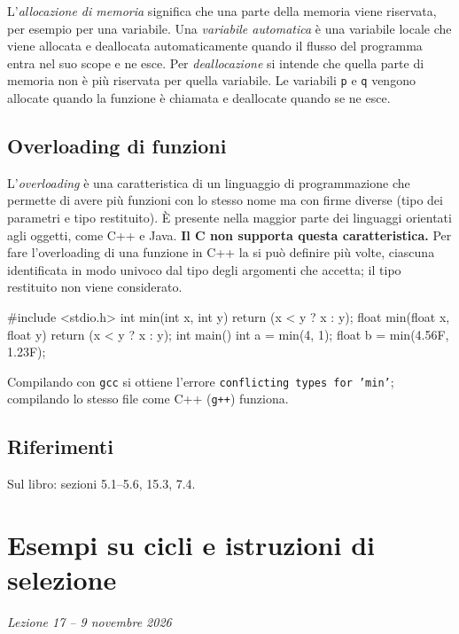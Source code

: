 \documentclass[11pt,a4paper]{article}
\begin{document}
L'\emph{allocazione di memoria} significa che una parte della memoria viene riservata, per esempio per una variabile. Una \emph{variabile automatica} è una variabile locale che viene allocata e deallocata automaticamente quando il flusso del programma entra nel suo scope e ne esce. Per \emph{deallocazione} si intende che quella parte di memoria non è più riservata per quella variabile. Le variabili \lstinline|p| e \lstinline|q| vengono allocate quando la funzione è chiamata e deallocate quando se ne esce.

\subsection{Overloading di funzioni}

L'\emph{overloading} è una caratteristica di un linguaggio di programmazione che permette di avere più funzioni con lo stesso nome ma con firme diverse (tipo dei parametri e tipo restituito). È presente nella maggior parte dei linguaggi orientati agli oggetti, come C++ e Java. \textbf{Il C non supporta questa caratteristica.} Per fare l'overloading di una funzione in C++ la si può definire più volte, ciascuna identificata in modo univoco dal tipo degli argomenti che accetta; il tipo restituito non viene considerato.

\begin{esempio}
\begin{codice}
#include <stdio.h>
int min(int x, int y) {
    return (x < y ? x : y);
}
float min(float x, float y) {
    return (x < y ? x : y);
}
int main() {
    int a = min(4, 1);
    float b = min(4.56F, 1.23F);
}
\end{codice}
Compilando con \texttt{gcc} si ottiene l'errore \texttt{conflicting types for 'min'}; compilando lo stesso file come C++ (\texttt{g++}) funziona.
\end{esempio}

\subsection{Riferimenti}

Sul libro: sezioni 5.1--5.6, 15.3, 7.4.

\section[Esempi su cicli e istruzioni di selezione (Lezione 17 -- 9 novembre 2026)]{Esempi su cicli e istruzioni di selezione}
\noindent\emph{Lezione 17 -- 9 novembre 2026}
\end{document}
